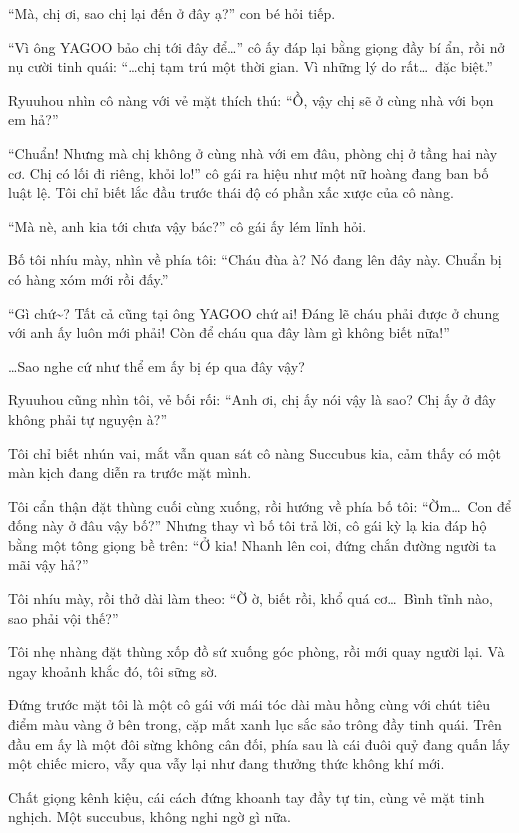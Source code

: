 \documentclass[../main.tex]{subfiles}
\begin{document}
``Mà, chị ơi, sao chị lại đến ở đây ạ?'' con bé hỏi tiếp.

``Vì ông YAGOO bảo chị tới đây để\dots'' cô ấy đáp lại bằng giọng đầy bí ẩn, rồi nở nụ cười tinh quái: ``\dots chị tạm trú một thời gian. Vì những lý do rất\dots\ đặc biệt.''

Ryuuhou nhìn cô nàng với vẻ mặt thích thú: ``Ồ, vậy chị sẽ ở cùng nhà với bọn em hả?''

``Chuẩn! Nhưng mà chị không ở cùng nhà với em đâu, phòng chị ở tầng hai này cơ. Chị có lối đi riêng, khỏi lo!'' cô gái ra hiệu như một nữ hoàng đang ban bố luật lệ. Tôi chỉ biết lắc đầu trước thái độ có phần xấc xược của cô nàng.

``Mà nè, anh kia tới chưa vậy bác?'' cô gái ấy lém lỉnh hỏi.

Bố tôi nhíu mày, nhìn về phía tôi: ``Cháu đùa à? Nó đang lên đây này. Chuẩn bị có hàng xóm mới rồi đấy.''

``Gì chứ\~{}? Tất cả cũng tại ông YAGOO chứ ai! Đáng lẽ cháu phải được ở chung với anh ấy luôn mới phải! Còn để cháu qua đây làm gì không biết nữa!''

\dots Sao nghe cứ như thể em ấy bị ép qua đây vậy?

Ryuuhou cũng nhìn tôi, vẻ bối rối: ``Anh ơi, chị ấy nói vậy là sao? Chị ấy ở đây không phải tự nguyện à?''

Tôi chỉ biết nhún vai, mắt vẫn quan sát cô nàng Succubus kia, cảm thấy có một màn kịch đang diễn ra trước mặt mình.

Tôi cẩn thận đặt thùng cuối cùng xuống, rồi hướng về phía bố tôi: ``Ờm\dots\ Con để đống này ở đâu vậy bố?'' Nhưng thay vì bố tôi trả lời, cô gái kỳ lạ kia đáp hộ bằng một tông giọng bề trên: ``Ở kia! Nhanh lên coi, đứng chắn đường người ta mãi vậy hả?''

Tôi nhíu mày, rồi thở dài làm theo: ``Ờ ờ, biết rồi, khổ quá cơ\dots\ Bình tĩnh nào, sao phải vội thế?''

Tôi nhẹ nhàng đặt thùng xốp đồ sứ xuống góc phòng, rồi mới quay người lại. Và ngay khoảnh khắc đó, tôi sững sờ.

Đứng trước mặt tôi là một cô gái với mái tóc dài màu hồng cùng với chút tiêu điểm màu vàng ở bên trong, cặp mắt xanh lục sắc sảo trông đầy tinh quái. Trên đầu em ấy là một đôi sừng không cân đối, phía sau là cái đuôi quỷ đang quấn lấy một chiếc micro, vẫy qua vẫy lại như đang thưởng thức không khí mới.

Chất giọng kênh kiệu, cái cách đứng khoanh tay đầy tự tin, cùng vẻ mặt tinh nghịch. Một succubus, không nghi ngờ gì nữa.
\end{document}
